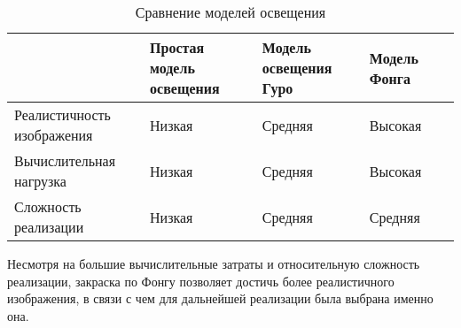 \noindent
\begin{table}[H]
    \caption{Сравнение моделей освещения}
    \label{tab:lighting-models}
\begin{adjustbox}{width=1\textwidth}
    \begin{tabular}{|p{}|p{}|p{}|p{}|p{}|}
        \hline
        &
        Простая модель освещения
        &
        Модель освещения Гуро
        &
        Модель Фонга
        \\
        \hline
        Реалистичность изображения
        &
        Низкая
        &
        Средняя
        &
        Высокая
        \\
        \hline
        Вычислительная нагрузка
        &
        Низкая
        &
        Средняя
        &
        Высокая
        \\
        \hline
        Сложность реализации
        &
        Низкая
        &
        Средняя
        &
        Средняя
        \\
        \hline
    \end{tabular}
\end{adjustbox}
\end{table}

Несмотря на большие вычислительные затраты и относительную сложность реализации, закраска по Фонгу позволяет достичь более реалистичного изображения, в связи с чем для дальнейшей реализации была выбрана именно она.
